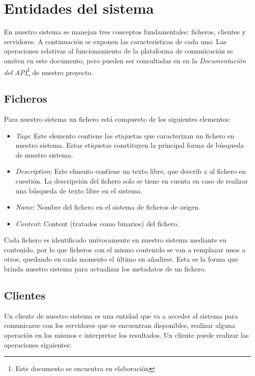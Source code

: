 \documentclass{article}
\begin{document}
\section{Entidades del sistema}

En nuestro sistema se manejan tres conceptos fundamentales: ficheros, clientes
y servidores. A continuación se exponen las características de cada uno. Las
operaciones relativas al funcionamiento de la plataforma de comunicación se
omiten en este documento, pero pueden ser consultadas en en la
\emph{Documentación del API}\footnote{Este documento se encuentra en
elaboración} de nuestro proyecto.

\subsection{Ficheros}

Para nuestro sistema un fichero está compuesto de los siguientes elementos:

\begin{itemize}
  \item \emph{Tags}: Este elemento contiene las etiquetas que caracterizan un
  fichero en nuestro sistema. Estas etiquetas constituyen la principal forma de
  búsqueda de nuestro sistema.
  \item \emph{Description}: Este elmento contiene un texto libre, que describ
  a al fichero en cuestión. La descripción del fichero solo se tiene en cuenta
  en caso de realizar una búsqueda de texto libre en el sistema.
  \item \emph{Name}: Nombre del fichero en el sistema de ficheros de origen.
  \item \emph{Content}: Content (tratados como binarios) del fichero.
\end{itemize} 

Cada fichero es identificado unívocamente en nuestro sistema mediante su
contenido, por lo que ficheros con el mismo contenido se van a remplazar unos a
otros, quedando en cada momento el último en añadirse. Esta es la forma que
brinda nuestro sistema para actualizar los metadatos de un fichero.

\subsection{Clientes}

Un cliente de nuestro sistema es una entidad que va a acceder al sistema para
comunicarse con los servidores que se encuentran disponibles, realizar alguna
operación en los mismos e interpretar los resultados. Un cliente puede realizar
las operaciones siguientes:
\end{document}
